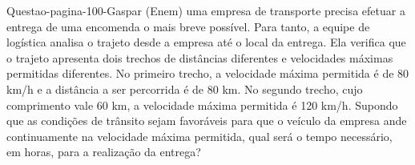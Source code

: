\documentclass[a4paper]{article}
\begin{document}
{\begin{question}{Questao-pagina-100-Gaspar} %
(Enem) uma empresa de transporte precisa efetuar a entrega de uma encomenda o mais breve possível. Para tanto, 
a equipe de logística analisa o trajeto desde a empresa até o local da entrega. Ela verifica que o trajeto apresenta
dois trechos de distâncias diferentes e velocidades máximas permitidas diferentes. No primeiro trecho, a velocidade
 máxima permitida é de 80 km/h e a distância a ser percorrida é de 80 km. No segundo trecho, cujo comprimento 
vale 60 km, a velocidade máxima permitida é 120 km/h. Supondo que as condições de trânsito sejam favoráveis
para que o veículo da empresa ande continuamente na velocidade máxima permitida, qual será o tempo necessário, 
em horas, para a realização da entrega?
\begin{choices}
\end{choices}
\end{question}




}   
\end{document}
